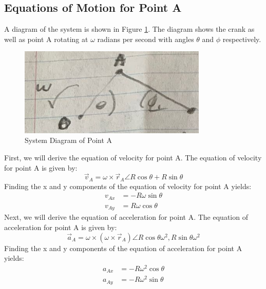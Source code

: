 \documentclass[12pt, titlepage]{article}
\begin{document}
\subsection{Equations of Motion for Point A}
A diagram of the system is shown in Figure \ref{fig:systemA}. The diagram
shows the crank as well as point A rotating at $\omega$ radians per second
with angles $\theta$ and $\phi$ respectively.
\begin{figure}[H]
    \centering
    \includegraphics[width=0.8\textwidth]{./Images/f1.png}
    \caption{System Diagram of Point A}
    \label{fig:systemA}
\end{figure}
First, we will derive the equation of velocity for point A. The equation of
velocity for point A is given by:
\begin{equation}
    \label{eq:vel}
    \vec{v}_A = \omega \times \vec{r}_A \angle R\cos\theta + R\sin\theta
\end{equation}
Finding the x and y components of the equation of velocity for point A yields:
\begin{equation}
    \label{eq:velxy}
    \begin{split}
        v_{Ax} &= -R\omega\sin\theta\\
        v_{Ay} &= R\omega\cos\theta
    \end{split}
\end{equation}
Next, we will derive the equation of acceleration for point A. The equation of
acceleration for point A is given by:
\begin{equation}
    \label{eq:acc}
    \vec{a}_A = \omega \times (\omega \times \vec{r}_A) \angle
    R\cos\theta\omega^2, R\sin\theta\omega^2
\end{equation}
Finding the x and y components of the equation of acceleration for point A
yields:
\begin{equation}
    \label{eq:accxy}
    \begin{split}
        a_{Ax} &= -R\omega^2\cos\theta\\
        a_{Ay} &= -R\omega^2\sin\theta
    \end{split}
\end{equation}
\end{document}
